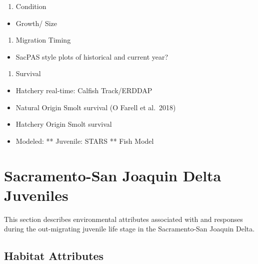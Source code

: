 \documentclass[
]{book}
\providecommand{\tightlist}{%
  \setlength{\itemsep}{0pt}\setlength{\parskip}{0pt}}
\theoremstyle{definition}
\theoremstyle{definition}
\theoremstyle{definition}
\theoremstyle{definition}
\theoremstyle{remark}
\begin{document}
\begin{enumerate}
\def\labelenumi{\arabic{enumi}.}
\setcounter{enumi}{1}
\tightlist
\item
  Condition
\end{enumerate}

\begin{itemize}
\tightlist
\item
  Growth/ Size
\end{itemize}

\begin{enumerate}
\def\labelenumi{\arabic{enumi}.}
\setcounter{enumi}{2}
\tightlist
\item
  Migration Timing
\end{enumerate}

\begin{itemize}
\tightlist
\item
  SacPAS style plots of historical and current year?
\end{itemize}

\begin{enumerate}
\def\labelenumi{\arabic{enumi}.}
\setcounter{enumi}{3}
\tightlist
\item
  Survival
\end{enumerate}

\begin{itemize}
\tightlist
\item
  Hatchery real-time: Calfish Track/ERDDAP
\item
  Natural Origin Smolt survival (O Farell et al.~2018)
\item
  Hatchery Origin Smolt survival
\item
  Modeled: ** Juvenile: STARS ** Fish Model
\end{itemize}

\hypertarget{sacramento-san-joaquin-delta-juveniles}{%
\chapter{Sacramento-San Joaquin Delta Juveniles}\label{sacramento-san-joaquin-delta-juveniles}}

This section describes environmental attributes associated with and responses during the out-migrating juvenile life stage in the Sacramento-San Joaquin Delta.

\hypertarget{habitat-attributes-4}{%
\section{Habitat Attributes}\label{habitat-attributes-4}}
\end{document}
